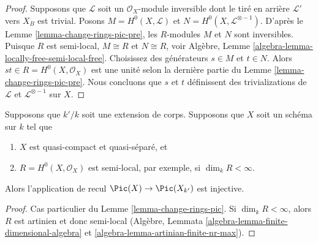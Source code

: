 \begin{proof}
Supposons que $\mathcal{L}$ soit un $\mathcal{O}_X$-module
inversible dont le tiré en arrière $\mathcal{L}'$ vers $X_B$ est
trivial. Posons $M = H^0(X, \mathcal{L})$ et $N = H^0(X,
\mathcal{L}^{\otimes - 1})$. D'après le Lemme
\ref{lemma-change-rings-pic-pre}, les $R$-modules $M$ et $N$ sont
inversibles. Puisque $R$ est semi-local, $M \cong R$ et $N \cong R$,
voir Algèbre, Lemme \ref{algebra-lemma-locally-free-semi-local-free}.
Choisissez des générateurs $s \in M$ et $t \in N$. Alors $st \in R =
H^0(X, \mathcal{O}_X)$ est une unité selon la dernière partie du Lemme
\ref{lemma-change-rings-pic-pre}. Nous concluons que $s$ et $t$ définissent
des trivializations de $\mathcal{L}$ et $\mathcal{L}^{\otimes -1}$ sur $X$.
\end{proof}

\begin{lemma}
\label{lemma-change-fields-pic}
Supposons que $k'/k$ soit une extension de corps.
Supposons que $X$ soit un schéma sur $k$ tel que
\begin{enumerate}
\item $X$ est quasi-compact et quasi-séparé, et \item $R = H^0(X,
\mathcal{O}_X)$ est semi-local, par exemple, si $\dim_k R < \infty$.
\end{enumerate}
Alors l'application de recul $\Pic(X) \to \Pic(X_{k'})$ est injective.
\end{lemma}

\begin{proof}
Cas particulier du Lemme
\ref{lemma-change-rings-pic}. Si $\dim_k R <
\infty$, alors $R$ est artinien et donc semi-local
(Algèbre, Lemmata
\ref{algebra-lemma-finite-dimensional-algebra} et \ref{algebra-lemma-artinian-finite-nr-max}).
\end{proof}

